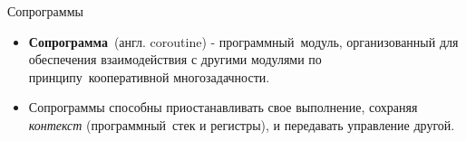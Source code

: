 
{
\begin{frame}[noframenumbering]
		\titlepage
\end{frame}
}

\begin{frame}{Сопрограммы}
	\begin{itemize}
		\item \textbf{Сопрограмма} (англ. coroutine) - программный модуль, организованный для обеспечения взаимодействия с другими модулями по принципу кооперативной многозадачности.
		
		\item Сопрограммы способны приостанавливать свое выполнение, сохраняя \textit{контекст} 
		(программный стек и регистры), и передавать управление другой.
	\end{itemize}
\end{frame}

